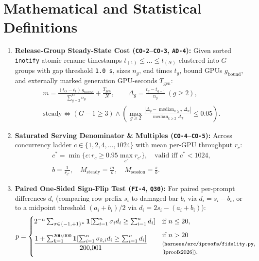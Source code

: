 \documentclass[11pt,letterpaper]{article}
\begin{document}
\section{Mathematical and Statistical Definitions}

\begin{enumerate}
\item \textbf{Release-Group Steady-State Cost (\texttt{CO-2}--\texttt{CO-3}, \texttt{AD-4}):} Given sorted \texttt{inotify} atomic-rename timestamps $t_{(1)} \le \dots \le t_{(N)}$ clustered into $G$ groups with gap threshold \texttt{1.0 s}, sizes $n_g$, end times $t_g$, bound GPUs $g_{\text{bound}}$, and externally marked generation GPU-seconds $T_{\text{gen}}$:
\begin{gather*}
m = \frac{(t_G - t_1)\, g_{\text{bound}}}{\sum_{g=2}^{G} n_g} + \frac{T_{\text{gen}}}{N}, \qquad \Delta_g = \frac{t_g - t_{g-1}}{n_g}\ (g \ge 2), \\
\text{steady} \iff (G - 1 \ge 3) \land \left(\max_{g \ge 2}\frac{|\Delta_g - \operatorname{median}_{k\ge 2}\Delta_k|}{\operatorname{median}_{k\ge 2}\Delta_k} \le 0.05\right).
\end{gather*}
\item \textbf{Saturated Serving Denominator \& Multiples (\texttt{CO-4}--\texttt{CO-5}):} Across concurrency ladder $c \in \{1, 2, 4, \dots, 1024\}$ with mean per-GPU throughput $r_c$:
\begin{gather*}
c^* = \min\{c : r_c \ge 0.95 \max_{c'} r_{c'}\}, \quad \text{valid iff } c^* < 1024, \\
b = \frac{1}{r_{c^*}}, \quad M_{\text{steady}} = \frac{\bar{m}}{b}, \quad M_{\text{session}} = \frac{\bar{s}}{b}.
\end{gather*}
\item \textbf{Paired One-Sided Sign-Flip Test (\texttt{FI-4}, \texttt{Q30}):} For paired per-prompt differences $d_i$ (comparing row prefix $s_i$ to damaged bar $b_i$ via $d_i = s_i - b_i$, or to a midpoint threshold $(a_i + b_i)/2$ via $d_i = 2 s_i - (a_i + b_i)$):
\[
p = \begin{cases} 2^{-n}\sum_{\sigma \in \{-1,+1\}^n} \mathbf{1}\!\left[\sum_{i=1}^n \sigma_i d_i \ge \sum_{i=1}^n d_i\right] & \text{if } n \le 20, \\[6pt] \dfrac{1 + \sum_{k=1}^{200{,}000} \mathbf{1}\!\left[\sum_{i=1}^n \sigma_{k,i} d_i \ge \sum_{i=1}^n d_i\right]}{200{,}001} & \begin{array}{@{}l@{}}\text{if } n > 20 \\[-2pt] \text{\footnotesize(\texttt{harness/src/iproofs/fidelity.py},} \\[-2pt] \text{\footnotesize\cite{iproofs2026}).}\end{array} \end{cases}
\]
\end{enumerate}
\end{document}
